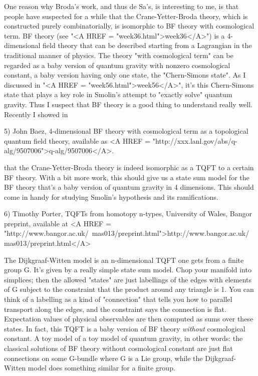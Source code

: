 One reason why Broda's work, and thus de Sa's, is interesting to me, is
that people have suspected for a while that the Crane-Yetter-Broda theory, 
which is constructed purely combinatorially, is isomorphic to BF theory with
cosmological term.  BF theory (see "<A HREF = "week36.html">week36</A>") is a 4-dimensional field theory 
that can be described starting from a Lagrangian in the traditional 
manner of physics.  The theory "with cosmological term" can be 
regarded as a baby version of quantum gravity with nonzero 
cosmological constant, a baby version having only one state, the
"Chern-Simons state". As I discussed in "<A HREF = "week56.html">week56</A>", it's this Chern-Simons state
that plays a key role in Smolin's attempt to "exactly solve" quantum gravity.  
Thus I suspect that BF theory is a good thing to understand really well.   
Recently I showed in  

5) John Baez, 4-dimensional BF theory with cosmological term as a topological
quantum field theory, available as 
<A HREF = "http://xxx.lanl.gov/abs/q-alg/9507006">q-alg/9507006</A>.

that the Crane-Yetter-Broda theory is indeed isomorphic as a TQFT to a certain 
BF theory. With a bit more work, this should give us a state sum model for 
the BF theory that's a baby version of quantum gravity in 4 dimensions.  
This should come in handy for studying Smolin's hypothesis and its 
ramifications.

6) Timothy Porter, TQFTs from homotopy n-types, University of Wales, 
Bangor preprint, available at
<A HREF = "http://www.bangor.ac.uk/~mas013/preprint.html">http://www.bangor.ac.uk/~mas013/preprint.html</A>

The Dijkgraaf-Witten model is an n-dimensional TQFT one gets from a finite 
group G.  It's given by a really simple state sum model.  Chop your manifold 
into simplices; then the allowed "states" are just labellings of  the 
edges with elements of G subject to the constraint that the product around 
any triangle is 1.  You can think of a labelling as a kind of "connection" 
that tells you how to parallel transport along the edges, and the 
constraint says the connection is flat.  Expectation values of
physical observables are then computed as sums over these states.
In fact, this TQFT is a baby version of BF theory \emph{without}
cosmological constant.  A toy model of a toy model of quantum gravity, 
in other words: the classical solutions of BF theory without 
cosmological constant are just flat connections on some G-bundle where 
G is a Lie group, while the Dijkgraaf-Witten model does something 
similar for a finite group.  

